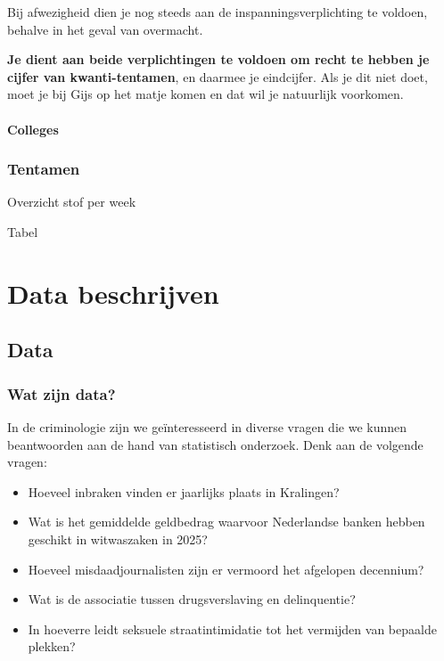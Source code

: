 \documentclass[
  letterpaper,
  DIV=11,
  numbers=noendperiod]{scrreprt}
\providecommand{\tightlist}{%
  \setlength{\itemsep}{0pt}\setlength{\parskip}{0pt}}
\begin{document}
Bij afwezigheid dien je nog steeds aan de inspanningsverplichting te
voldoen, behalve in het geval van overmacht.

\textbf{Je dient aan beide verplichtingen te voldoen om recht te hebben
je cijfer van kwanti-tentamen}, en daarmee je eindcijfer. Als je dit
niet doet, moet je bij Gijs op het matje komen en dat wil je natuurlijk
voorkomen.

\subsection{Colleges}\label{colleges}

\section{Tentamen}\label{tentamen}

Overzicht stof per week

Tabel

\part{Data beschrijven}

\chapter{Data}\label{data}

\section{\texorpdfstring{\textbf{Wat zijn
data?}}{Wat zijn data?}}\label{sec-data}

In de criminologie zijn we geïnteresseerd in diverse vragen die we
kunnen beantwoorden aan de hand van statistisch onderzoek. Denk aan de
volgende vragen:

\begin{itemize}
\tightlist
\item
  Hoeveel inbraken vinden er jaarlijks plaats in Kralingen?
\item
  Wat is het gemiddelde geldbedrag waarvoor Nederlandse banken hebben
  geschikt in witwaszaken in 2025?
\item
  Hoeveel misdaadjournalisten zijn er vermoord het afgelopen decennium?
\item
  Wat is de associatie tussen drugsverslaving en delinquentie?
\item
  In hoeverre leidt seksuele straatintimidatie tot het vermijden van
  bepaalde plekken?
\end{itemize}
\end{document}

